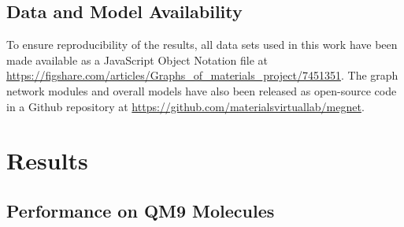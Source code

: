 \documentclass[manuscript=article]{achemso}
\begin{document}
\subsection{Data and Model Availability}

To ensure reproducibility of the results, all data sets used in this work have been made available as a JavaScript Object Notation file at \url{https://figshare.com/articles/Graphs_of_materials_project/7451351}. The graph network modules and overall models have also been released as open-source code in a Github repository at \url{https://github.com/materialsvirtuallab/megnet}.

\section{Results}

\subsection{Performance on QM9 Molecules}
\end{document}
